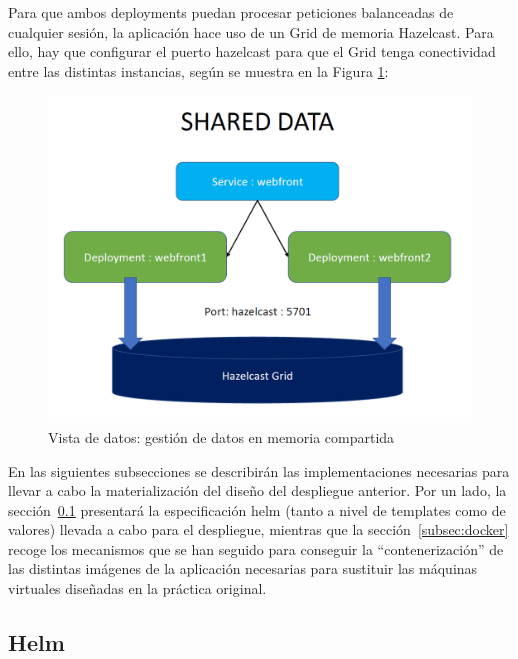 \documentclass[12pt,spanish]{article}
\begin{document}
Para que ambos deployments puedan procesar peticiones balanceadas de cualquier sesión, la aplicación hace uso de un Grid de memoria Hazelcast. Para ello, hay que configurar el puerto hazelcast para que el Grid tenga conectividad entre las distintas instancias, según se muestra en la Figura \ref{fig:sharedData00}:
\begin{center}
 \begin{figure}[H]
 \begin{center}
   \includegraphics[width=18cm]{img/sharedData00.png}
   \caption{Vista de datos: gestión de datos en memoria compartida}
   \label{fig:sharedData00}
 \end{center}
 \end{figure}
\end{center}

En las siguientes subsecciones se describirán las implementaciones necesarias para llevar a cabo la materialización del diseño del despliegue anterior. Por un lado, la sección~\ref{subsec:helm} presentará la especificación helm (tanto a nivel de templates como de valores) llevada a cabo para el despliegue, mientras que la sección~\ref{subsec:docker} recoge los mecanismos que se han seguido para conseguir la ``contenerización'' de las distintas imágenes de la aplicación necesarias para sustituir las máquinas virtuales diseñadas en la práctica original.

\subsection{Helm}
\label{subsec:helm}
\end{document}
